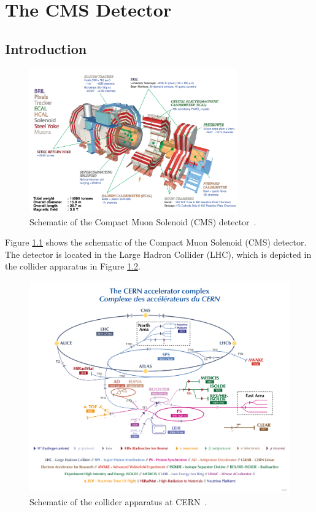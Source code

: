 \chapter{The CMS Detector}\label{chap:cms}


\section{Introduction}\label{sec:ch3:intro}

 \begin{figure}[h]
\centering
\includegraphics[width=0.8\textwidth]{figures/cms_schematic.png}
\caption{Schematic of the Compact Muon Solenoid (CMS) detector~\cite{cms_schematic}.}
\label{fig:cms}
\end{figure}

Figure \ref{fig:cms} shows the schematic of the Compact Muon Solenoid (CMS) detector. The detector is located in the Large Hadron Collider (LHC), which is depicted in the collider apparatus in Figure \ref{fig:cern}.

 \begin{figure}[h]
\centering
\includegraphics[width=1.0\textwidth]{figures/CCC-v2022.png}
\caption{Schematic of the collider apparatus at CERN~\cite{CERN_Accelerator_Complex}.}
\label{fig:cern}
\end{figure}


